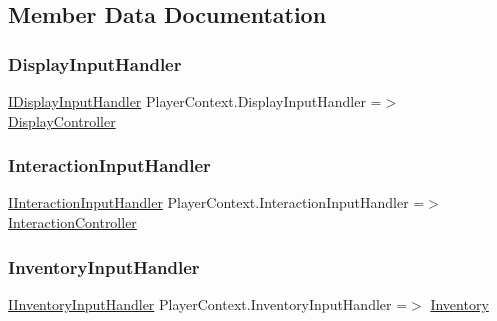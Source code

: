 \subsection{Member Data Documentation}
\mbox{\label{class_player_context_afe76851a64e1dead1e592a564e1feea5}} 
\subsubsection{\texorpdfstring{Display\+Input\+Handler}{DisplayInputHandler}}
{\footnotesize\ttfamily \mbox{\hyperlink{interface_i_display_input_handler}{I\+Display\+Input\+Handler}} Player\+Context.\+Display\+Input\+Handler =$>$ \mbox{\hyperlink{class_display_controller}{Display\+Controller}}}

\mbox{\label{class_player_context_a3b6b363dca05592b291c6b69ccd08121}} 
\subsubsection{\texorpdfstring{Interaction\+Input\+Handler}{InteractionInputHandler}}
{\footnotesize\ttfamily \mbox{\hyperlink{interface_i_interaction_input_handler}{I\+Interaction\+Input\+Handler}} Player\+Context.\+Interaction\+Input\+Handler =$>$ \mbox{\hyperlink{class_interaction_controller}{Interaction\+Controller}}}

\mbox{\label{class_player_context_ae39b126c6b5353de0f01bc0e90a2df16}} 
\subsubsection{\texorpdfstring{Inventory\+Input\+Handler}{InventoryInputHandler}}
{\footnotesize\ttfamily \mbox{\hyperlink{interface_i_inventory_input_handler}{I\+Inventory\+Input\+Handler}} Player\+Context.\+Inventory\+Input\+Handler =$>$ \mbox{\hyperlink{class_inventory}{Inventory}}}



